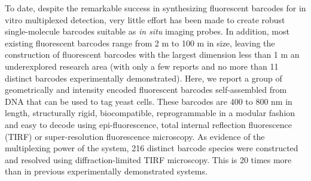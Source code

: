To date, despite the remarkable 
success in synthesizing fluorescent barcodes for in vitro multiplexed detection, very little 
effort has been made to create robust single-molecule barcodes suitable as \textit{in situ} imaging 
probes. In addition, most existing fluorescent barcodes range from 2 \textmu m to 100 \textmu m in 
size, leaving the construction of fluorescent barcodes with the largest dimension less than 1 
\textmu m an underexplored research area (with only a few reports  \citep{li_multiplexed_2005,lin_self-assembled_2007,li_controlled_2010,levsky_single-cell_2002} and no more than 11 
distinct barcodes experimentally demonstrated). Here, we report a group of geometrically and intensity 
encoded fluorescent barcodes self-assembled from DNA that can be used to tag yeast 
cells. These barcodes are 400 to 800 nm in length, structurally rigid, biocompatible, 
reprogrammable in a modular fashion and easy to decode using epi-fluorescence, total internal reflection fluorescence (TIRF) or 
super-resolution fluorescence microscopy. As evidence of the multiplexing power of the 
system, 216 distinct barcode species were constructed and resolved using diffraction-limited TIRF 
microscopy. This is 20 times more than in previous experimentally 
demonstrated systems.

